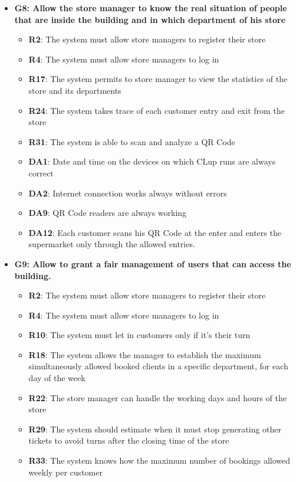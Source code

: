 \documentclass{article}
\begin{document}
\begin{itemize}
\begin{itemize}
					\end{itemize}	
	

				\item {\bfseries G8: Allow the store manager to know the real situation of people that are inside the building and in which department of his store}	

					\begin{itemize}
						
						\item {\bfseries R2}: The system must allow store managers to register their store
						\item {\bfseries R4}: The system must allow store managers to log in
						\item {\bfseries R17}: The system permits to store manager to view the statistics of the store and its departments
						\item {\bfseries R24}: The system takes trace of each customer entry and exit from the store
						\item {\bfseries R31}: The system is able to scan and analyze a QR Code \\		
				
						\item {\bfseries DA1}: Date and time on the devices on which CLup runs are always correct
						\item {\bfseries DA2}: Internet connection works always without errors
						\item {\bfseries DA9}: QR Code readers are always working
						\item {\bfseries DA12}: Each customer scans his QR Code at the enter and enters the supermarket only through the allowed entries.
							
					\end{itemize}

				\item {\bfseries G9: Allow to grant a fair management of users that can access the building.}	

					\begin{itemize}
						
						\item {\bfseries R2}: The system must allow store managers to register their store
						\item {\bfseries R4}: The system must allow store managers to log in
						\item {\bfseries R10}: The system must let in customers only if it's their turn
						\item {\bfseries R18}: The system allows the manager to establish the maximum simultaneously allowed booked clients in a specific department, for each day of the week
						\item {\bfseries R22}: The store manager can handle the working days and hours of the store
						\item {\bfseries R29}: The system should estimate when it must stop generating other tickets to avoid turns after the closing time of the store 
						\item {\bfseries R33}: The system knows how the maximum number of bookings allowed weekly per customer\\
						

\end{itemize}
\end{itemize}
\end{document}
